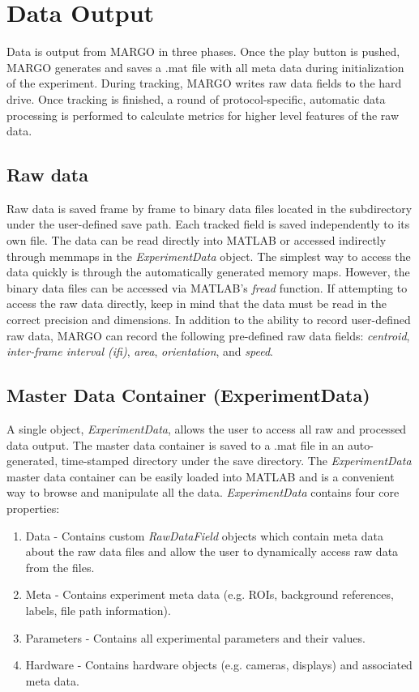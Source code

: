 \documentclass[11pt]{article}
\begin{document}
\newpage
\section{Data Output}

Data is output from MARGO in three phases. Once the play button is pushed, MARGO generates and saves a .mat file with all meta data during initialization of the experiment. During tracking, MARGO writes raw data fields to the hard drive. Once tracking is finished, a round of protocol-specific, automatic data processing is performed to calculate metrics for higher level features of the raw data.

\subsection{Raw data}

Raw data is saved frame by frame to binary data files located in the subdirectory under the user-defined save path. Each tracked field is saved independently to its own file. The data can be read directly into MATLAB or accessed indirectly through memmaps in the \textit{ExperimentData} object. The simplest way to access the data quickly is through the automatically generated memory maps. However, the binary data files can be accessed via MATLAB's \textit{fread} function. If attempting to access the raw data directly, keep in mind that the data must be read in the correct precision and dimensions. In addition to the ability to record user-defined raw data, MARGO can record the following pre-defined raw data fields: \textit{centroid},\textit{ inter-frame interval (ifi)}, \textit{area}, \textit{orientation}, and \textit{speed}.

\subsection{Master Data Container (ExperimentData)}

A single object, \textit{ExperimentData}, allows the user to access all raw and processed data output. The master data container is saved to a .mat file in an auto-generated, time-stamped directory under the save directory. The \textit{ExperimentData} master data container can be easily loaded into MATLAB and is a convenient way to browse and manipulate all the data.  \textit{ExperimentData} contains four core properties:

\begin{enumerate}
	\item Data - Contains custom \textit{RawDataField} objects which contain meta data about the raw data files and allow the user to dynamically access raw data from the files.
	\item Meta - Contains experiment meta data (e.g. ROIs, background references, labels, file path information).
	\item Parameters - Contains all experimental parameters and their values.
	\item Hardware - Contains hardware objects (e.g. cameras, displays) and associated meta data.
\end{enumerate}
\end{document}
